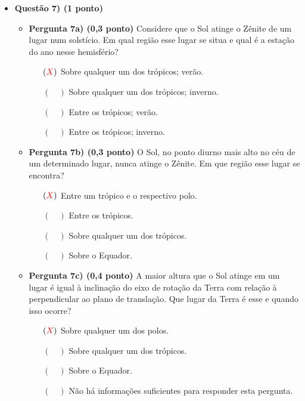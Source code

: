 \documentclass[a4paper, 12pt]{article}
\newcommand{\red}[1]{\textcolor{red}{#1}}
\begin{document}
\begin{flushleft}
\begin{itemize}
        \item \textbf{Questão 7) (1 ponto)}
            \begin{itemize}
                \item \textbf{Pergunta 7a) (0,3 ponto)} Considere que o Sol atinge o Zênite de um lugar num solstício. Em qual região esse lugar se situa e qual é a estação do ano nesse hemisfério?
                    \begin{itemize}
                        \item[$(\red{X})$] Sobre qualquer um dos trópicos; verão.
                        \item[$(\quad)$] Sobre qualquer um dos trópicos; inverno.
                        \item[$(\quad)$] Entre os trópicos; verão.
                        \item[$(\quad)$] Entre os trópicos; inverno.
                    \end{itemize}
                \item \textbf{Pergunta 7b) (0,3 ponto)} O Sol, no ponto diurno mais alto no céu de um determinado lugar, nunca atinge o Zênite. Em que região esse lugar se encontra?
                    \begin{itemize}
                        \item[$(\red{X})$] Entre um trópico e o respectivo polo.
                        \item[$(\quad)$] Entre os trópicos.
                        \item[$(\quad)$] Sobre qualquer um dos trópicos.
                        \item[$(\quad)$] Sobre o Equador.
                    \end{itemize}
                \item \textbf{Pergunta 7c) (0,4 ponto)} A maior altura que o Sol atinge em um lugar é igual à inclinação do eixo de rotação da Terra com relação à perpendicular ao plano de translação. Que lugar da Terra é esse e quando isso ocorre?
                    \begin{itemize}
                        \item[$(\red{X})$] Sobre qualquer um dos polos.
                        \item[$(\quad)$] Sobre qualquer um dos trópicos.
                        \item[$(\quad)$] Sobre o Equador.
                        \item[$(\quad)$] Não há informações suficientes para responder esta pergunta.
                    \end{itemize}
            \end{itemize}


\end{itemize}
\end{flushleft}
\end{document}
